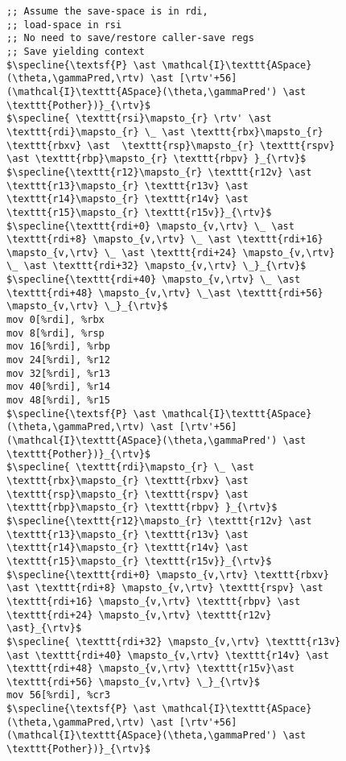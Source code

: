 
\begin{figure}
\begin{lstlisting}
;; Assume the save-space is in rdi,
;; load-space in rsi
;; No need to save/restore caller-save regs
;; Save yielding context
$\specline{\textsf{P} \ast \mathcal{I}\texttt{ASpace}(\theta,\gammaPred,\rtv) \ast [\rtv'+56](\mathcal{I}\texttt{ASpace}(\theta,\gammaPred') \ast \texttt{Pother})}_{\rtv}$
$\specline{ \texttt{rsi}\mapsto_{r} \rtv' \ast \texttt{rdi}\mapsto_{r} \_ \ast \texttt{rbx}\mapsto_{r} \texttt{rbxv} \ast  \texttt{rsp}\mapsto_{r} \texttt{rspv} \ast \texttt{rbp}\mapsto_{r} \texttt{rbpv} }_{\rtv}$
$\specline{\texttt{r12}\mapsto_{r} \texttt{r12v} \ast \texttt{r13}\mapsto_{r} \texttt{r13v} \ast \texttt{r14}\mapsto_{r} \texttt{r14v} \ast \texttt{r15}\mapsto_{r} \texttt{r15v}}_{\rtv}$
$\specline{\texttt{rdi+0} \mapsto_{v,\rtv} \_ \ast \texttt{rdi+8} \mapsto_{v,\rtv} \_ \ast \texttt{rdi+16} \mapsto_{v,\rtv} \_ \ast \texttt{rdi+24} \mapsto_{v,\rtv} \_ \ast \texttt{rdi+32} \mapsto_{v,\rtv} \_}_{\rtv}$
$\specline{\texttt{rdi+40} \mapsto_{v,\rtv} \_ \ast \texttt{rdi+48} \mapsto_{v,\rtv} \_\ast \texttt{rdi+56} \mapsto_{v,\rtv} \_}_{\rtv}$
mov 0[%rdi], %rbx
mov 8[%rdi], %rsp
mov 16[%rdi], %rbp
mov 24[%rdi], %r12
mov 32[%rdi], %r13
mov 40[%rdi], %r14
mov 48[%rdi], %r15
$\specline{\textsf{P} \ast \mathcal{I}\texttt{ASpace}(\theta,\gammaPred,\rtv) \ast [\rtv'+56](\mathcal{I}\texttt{ASpace}(\theta,\gammaPred') \ast \texttt{Pother})}_{\rtv}$
$\specline{ \texttt{rdi}\mapsto_{r} \_ \ast \texttt{rbx}\mapsto_{r} \texttt{rbxv} \ast  \texttt{rsp}\mapsto_{r} \texttt{rspv} \ast \texttt{rbp}\mapsto_{r} \texttt{rbpv} }_{\rtv}$
$\specline{\texttt{r12}\mapsto_{r} \texttt{r12v} \ast \texttt{r13}\mapsto_{r} \texttt{r13v} \ast \texttt{r14}\mapsto_{r} \texttt{r14v} \ast \texttt{r15}\mapsto_{r} \texttt{r15v}}_{\rtv}$
$\specline{\texttt{rdi+0} \mapsto_{v,\rtv} \texttt{rbxv} \ast \texttt{rdi+8} \mapsto_{v,\rtv} \texttt{rspv} \ast \texttt{rdi+16} \mapsto_{v,\rtv} \texttt{rbpv} \ast \texttt{rdi+24} \mapsto_{v,\rtv} \texttt{r12v} \ast}_{\rtv}$
$\specline{ \texttt{rdi+32} \mapsto_{v,\rtv} \texttt{r13v} \ast \texttt{rdi+40} \mapsto_{v,\rtv} \texttt{r14v} \ast \texttt{rdi+48} \mapsto_{v,\rtv} \texttt{r15v}\ast \texttt{rdi+56} \mapsto_{v,\rtv} \_}_{\rtv}$
mov 56[%rdi], %cr3
$\specline{\textsf{P} \ast \mathcal{I}\texttt{ASpace}(\theta,\gammaPred,\rtv) \ast [\rtv'+56](\mathcal{I}\texttt{ASpace}(\theta,\gammaPred') \ast \texttt{Pother})}_{\rtv}$

\end{lstlisting}
\end{figure}
